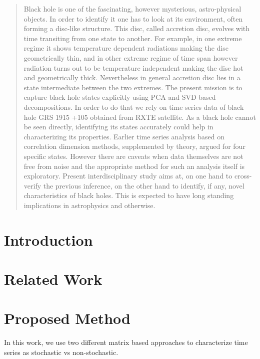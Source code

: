\documentclass[10pt,conference]{IEEEtran}
\begin{document}
\begin{abstract}
Black hole is one of the fascinating,  however mysterious, astro-physical  objects. In order to identify it one has to look at its environment, often forming a disc-like structure. This disc, called accretion disc, evolves with time transiting from one state to another. For example, in one extreme regime it shows temperature dependent radiations making the disc geometrically thin, and in other extreme  regime of time span however radiation turns out to be temperature independent making the disc hot and geometrically thick.  Nevertheless in general accretion disc lies in a state intermediate between the two extremes. The present mission is to capture black hole states  explicitly using PCA and SVD based decompositions. In order to do that we rely on time series data of black hole GRS 1915 +105 obtained from RXTE satellite. As a black hole cannot be seen directly, identifying its states accurately could help in characterizing its properties. Earlier time series  analysis based on correlation dimension methods, supplemented by theory, argued for four specific states. However there are caveats when data themselves are not free from noise and the  appropriate method for such an analysis itself is exploratory. Present interdisciplinary study aims at, on one hand to cross-verify the previous inference, on the other hand to identify, if any,  novel characteristics of black holes. This is expected to have long standing implications in astrophysics and otherwise.
\end{abstract}

\section{Introduction}


\section{Related Work}


\section{Proposed Method}
In this work, we use two different matrix based approaches to characterize time series as stochastic vs non-stochastic.
\end{document}
